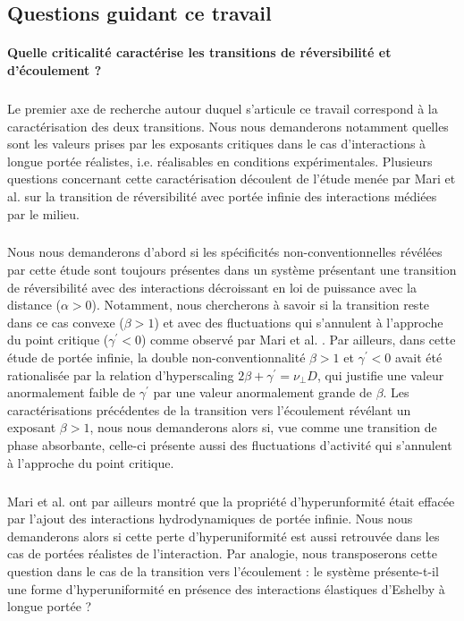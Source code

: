 \subsection{Questions guidant ce travail}

\paragraph{Quelle criticalité caractérise les transitions de réversibilité et d'écoulement ?}

\subparagraph{}Le premier axe de recherche autour duquel s'articule ce travail correspond à la caractérisation des deux transitions. Nous nous demanderons notamment quelles sont les valeurs prises par les exposants critiques dans le cas d'interactions à longue portée réalistes, i.e. réalisables en conditions expérimentales. Plusieurs questions concernant cette caractérisation découlent de l'étude menée par Mari et al. \cite{mari_absorbing_2022} sur la transition de réversibilité avec portée infinie des interactions médiées par le milieu. 

\subparagraph{}Nous nous demanderons d'abord si les spécificités non-conventionnelles révélées par cette étude sont toujours présentes dans un système présentant une transition de réversibilité avec des interactions décroissant en loi de puissance avec la distance ($\alpha > 0$). Notamment, nous chercherons à savoir si la transition reste dans ce cas convexe ($\beta >1$) et avec des fluctuations qui s'annulent à l'approche du point critique ($\gamma^\prime < 0$) comme observé par Mari et al. \cite{mari_absorbing_2022}. Par ailleurs, dans cette étude de portée infinie, la double non-conventionnalité $\beta >1$ et $\gamma^\prime < 0$ avait été rationalisée par la relation d'hyperscaling $2\beta + \gamma^\prime = \nu_\perp D$, qui justifie une valeur anormalement faible de $\gamma^\prime$ par une valeur anormalement grande de $\beta$. Les caractérisations précédentes de la transition vers l'écoulement révélant un exposant $\beta >1$, nous nous demanderons alors si, vue comme une transition de phase absorbante, celle-ci présente aussi des fluctuations d'activité qui s'annulent à l'approche du point critique.

\subparagraph{}Mari et al. ont par ailleurs montré que la propriété d'hyperunformité était effacée par l'ajout des interactions hydrodynamiques de portée infinie. Nous nous demanderons alors si cette perte d'hyperuniformité est aussi retrouvée dans les cas de portées réalistes de l'interaction. Par analogie, nous transposerons cette question dans le cas de la transition vers l'écoulement : le système présente-t-il une forme d'hyperuniformité en présence des interactions élastiques d'Eshelby à longue portée ?

